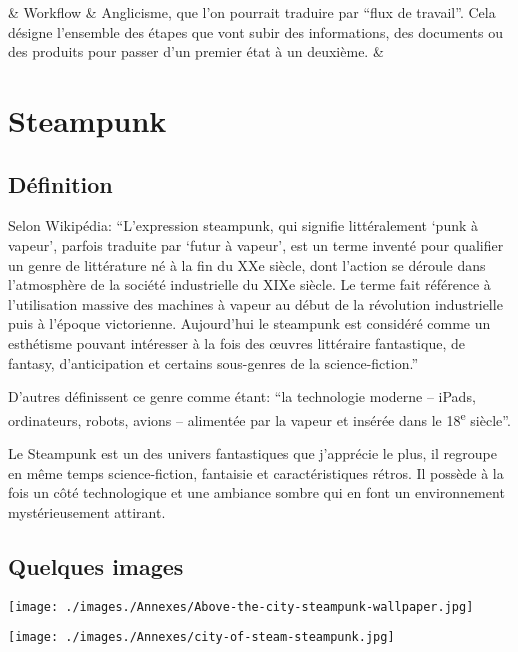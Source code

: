 \begin{center}
\begin{longtabu}
		& Workflow & Anglicisme, que l'on pourrait traduire par \enquote{flux de travail}. Cela désigne l'ensemble des étapes que vont subir des informations, des documents ou des produits pour passer d'un premier état à un deuxième. & \\
	\end{longtabu}
\end{center}


\chapter{Steampunk}
\newpage

\label{app:steampunk}
\section{Définition}
Selon Wikipédia: \enquote{L'expression steampunk, qui signifie littéralement \enquote{punk à vapeur}, parfois traduite par \enquote{futur à vapeur}, est un terme inventé pour qualifier un genre de littérature né à la fin du XXe siècle, dont l'action se déroule dans l'atmosphère de la société industrielle du XIXe siècle. Le terme fait référence à l'utilisation massive des machines à vapeur au début de la révolution industrielle puis à l'époque victorienne. Aujourd'hui le steampunk est considéré comme un esthétisme pouvant intéresser à la fois des œuvres littéraire fantastique, de fantasy, d'anticipation et certains sous-genres de la science-fiction.}\cite{Steampunk_}

D'autres définissent ce genre comme étant: \enquote{la technologie moderne -- iPads, ordinateurs, robots, avions -- alimentée par la vapeur et insérée dans le 18\textsuperscript{e} siècle}.\cite{Whatissteampunk_}

Le Steampunk est un des univers fantastiques que j'apprécie le plus, il regroupe en même temps science-fiction, fantaisie et caractéristiques rétros. Il possède à la fois un côté technologique et une ambiance sombre qui en font un environnement mystérieusement attirant.

\newpage
\section{Quelques images}
\vspace*{-.5cm}
\begin{minipage}{.49\textwidth}
\texttt{[image: ./images./Annexes/Above-the-city-steampunk-wallpaper.jpg]}
\\[-1mm]
\end{minipage}
\hspace{.02\textwidth}
\begin{minipage}{.49\textwidth}
\texttt{[image: ./images./Annexes/city-of-steam-steampunk.jpg]}
\\[-1mm]
\end{minipage}


